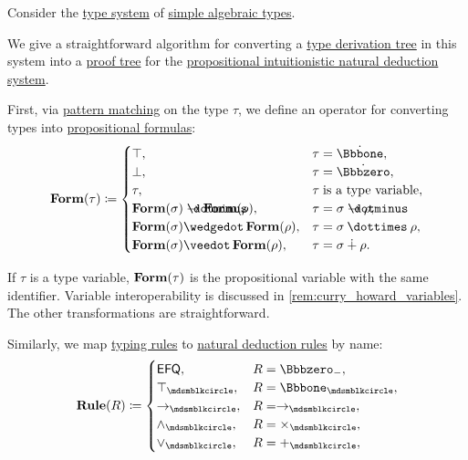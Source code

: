 \begin{algorithm}\label{alg:type_derivation_to_proof_tree}
  Consider the \hyperref[def:abstract_type_system]{type system} of \hyperref[def:simple_algebraic_types]{simple algebraic types}.

  We give a straightforward algorithm for converting a \hyperref[def:type_derivation_tree]{type derivation tree} in this system into a \hyperref[def:propositional_natural_deduction_proof_tree]{proof tree} for the \hyperref[def:propositional_natural_deduction_systems]{propositional intuitionistic natural deduction system}.

  \begin{thmenum}
     First, via \hyperref[con:evaluation]{pattern matching} on the type \( \tau \), we define an operator for converting types into \hyperref[def:propositional_syntax/formula]{propositional formulas}:
    \begin{equation*}
      \op*{Form}(\tau) \coloneqq \begin{cases}
        \top,                                            &\tau = \syn\Bbbone, \\
        \bot,                                            &\tau = \syn\Bbbzero, \\
        \tau,                                            &\tau \T{is a type variable}, \\
        \op*{Form}(\sigma) \synimplies \op*{Form}(\rho), &\tau = \sigma \synimplies \rho, \\
        \op*{Form}(\sigma) \synwedge \op*{Form}(\rho),   &\tau = \sigma \syntimes \rho, \\
        \op*{Form}(\sigma) \synvee \op*{Form}(\rho),     &\tau = \sigma \synplus \rho. \\
      \end{cases}
    \end{equation*}

    If \( \tau \) is a type variable, \( \op*{Form}(\tau) \) is the propositional variable with the same identifier. Variable interoperability is discussed in \cref{rem:curry_howard_variables}. The other transformations are straightforward.

     Similarly, we map \hyperref[def:simple_typing_rule]{typing rules} to \hyperref[def:natural_deduction_rule]{natural deduction rules} by name:
    \begin{equation*}
      \op*{Rule}(R) \coloneqq \begin{cases}
        \logic{EFQ},         &R = \Bbbzero_-, \\
        \top_{\Anon},        &R = \Bbbone_{\Anon}, \\
        \rightarrow_{\Anon}, &R = \rightarrow_{\Anon}, \\
        \wedge_{\Anon},      &R = \times_{\Anon}, \\
        \vee_{\Anon},        &R = +_{\Anon}, \\
      \end{cases}
    \end{equation*}


\end{thmenum}
\end{algorithm}
